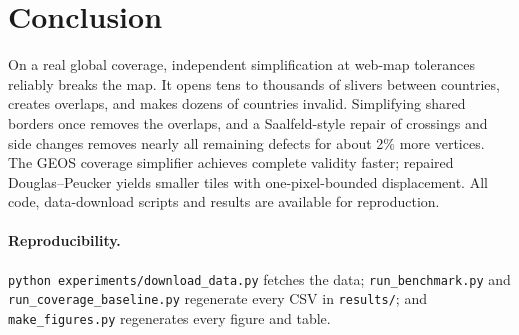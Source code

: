\documentclass[11pt]{article}
\begin{document}
\section{Conclusion}

On a real global coverage, independent simplification at web-map tolerances
reliably breaks the map. It opens tens to thousands of slivers between
countries, creates overlaps, and makes dozens of countries invalid. Simplifying
shared borders once removes the overlaps, and a Saalfeld-style repair of
crossings and side changes removes nearly all remaining defects for about 2\%
more vertices. The GEOS coverage simplifier achieves complete validity faster;
repaired Douglas--Peucker yields smaller tiles with one-pixel-bounded
displacement. All code, data-download scripts and results are available for
reproduction.

\paragraph{Reproducibility.}
\texttt{python experiments/download\_data.py} fetches the data;
\texttt{run\_benchmark.py} and \texttt{run\_coverage\_baseline.py} regenerate
every CSV in \texttt{results/}; and \texttt{make\_figures.py} regenerates every
figure and table.



\end{document}
